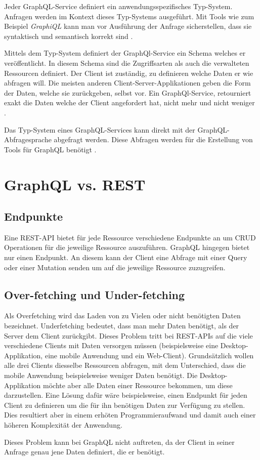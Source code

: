 Jeder GraphQL-Service definiert ein anwendungsspezifisches Typ-System.
Anfragen werden im Kontext dieses Typ-Systems ausgeführt.
Mit Tools wie zum Beispiel \textit{GraphiQL} kann man vor Ausführung der Anfrage sicherstellen, dass sie syntaktisch und semantisch korrekt sind \cite[Abs. 1]{graphqlOnline}.

Mittels dem Typ-System definiert der GraphQl-Service ein Schema welches er veröffentlicht.
In diesem Schema sind die Zugriffsarten als auch die verwalteten Ressourcen definiert.
Der Client ist zuständig, zu definieren welche Daten er wie abfragen will.
Die meisten anderen Client-Server-Applikationen geben die Form der Daten, welche sie zurückgeben, selbst vor.
Ein GraphQl-Service, retourniert exakt die Daten welche der Client angefordert hat, nicht mehr und nicht weniger \cite[Abs. 1]{graphqlOnline}.

Das Typ-System eines GraphQL-Services kann direkt mit der GraphQL-Abfragesprache abgefragt werden. Diese Abfragen werden für die Erstellung von Tools für GraphQL benötigt \cite[Abs. 1]{graphqlOnline}.

\section{GraphQL vs. REST}
\subsection{Endpunkte}
Eine REST-API bietet für jede Ressource verschiedene Endpunkte an um CRUD Operationen für die jeweilige Ressource auszuführen. GraphQL hingegen bietet nur einen
Endpunkt. An diesem kann der Client eine Abfrage mit einer Query oder einer Mutation senden um auf die jeweilige Ressource zuzugreifen.

\subsection{Over-fetching und Under-fetching}
Als Overfetching wird das Laden von zu Vielen oder nicht benötigten Daten bezeichnet.
Underfetching bedeutet, dass man mehr Daten benötigt, als der Server dem Client zurückgibt.
Dieses Problem tritt bei REST-APIs auf die viele verschiedene Clients mit Daten versorgen müssen (beispielsweise eine Desktop-Applikation, eine mobile Anwendung und ein Web-Client).
Grundsätzlich wollen alle drei Clients diesselbe Ressourcen abfragen, mit dem Unterschied, dass die mobile Anwendung beispielsweise weniger Daten benötigt.
Die Desktop-Applikation möchte aber alle Daten einer Ressource bekommen, um diese darzustellen.
Eine Lösung dafür wäre beispielsweise, einen Endpunkt für jeden Client zu definieren um die für ihn benötigen Daten zur Verfügung zu stellen.
Dies resultiert aber in einem erhöten Programmieraufwand und damit auch einer höheren Komplexität der Anwendung.
\newline

Dieses Problem kann bei GraphQL nicht auftreten, da der Client in seiner Anfrage genau jene Daten definiert, die er benötigt.